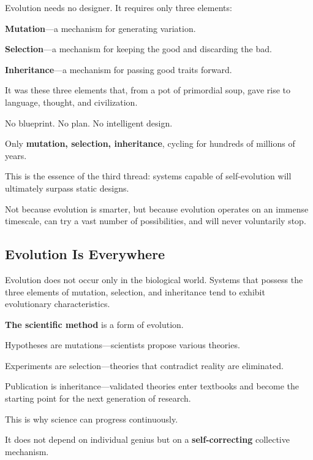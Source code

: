 Evolution needs no designer. It requires only three elements:

\textbf{Mutation}---a mechanism for generating variation.

\textbf{Selection}---a mechanism for keeping the good and discarding the bad.

\textbf{Inheritance}---a mechanism for passing good traits forward.

\vspace{1em}

It was these three elements that, from a pot of primordial soup, gave rise to language, thought, and civilization.

No blueprint. No plan. No intelligent design.

Only \textbf{mutation, selection, inheritance}, cycling for hundreds of millions of years.

This is the essence of the third thread: systems capable of self-evolution will ultimately surpass static designs.

Not because evolution is smarter,
but because evolution operates on an immense timescale, can try a vast number of possibilities, and will never voluntarily stop.

\subsection{Evolution Is Everywhere}

Evolution does not occur only in the biological world. Systems that possess the three elements of mutation, selection, and inheritance tend to exhibit evolutionary characteristics.

\vspace{1em}

\textbf{The scientific method} is a form of evolution.

Hypotheses are mutations---scientists propose various theories.

Experiments are selection---theories that contradict reality are eliminated.

Publication is inheritance---validated theories enter textbooks and become the starting point for the next generation of research.

This is why science can progress continuously.

It does not depend on individual genius but on a \textbf{self-correcting} collective mechanism.

\vspace{1em}

